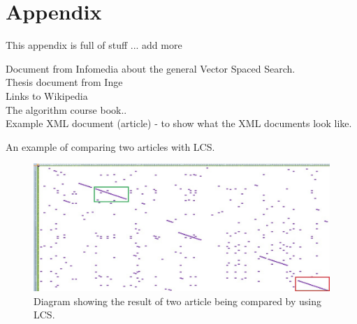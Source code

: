 \chapter{Appendix}

This appendix is full of stuff ... add more

Document from Infomedia about the general Vector Spaced Search.\\
Thesis document from Inge\\
Links to Wikipedia\\
The algorithm course book..\\
Example XML document (article) - to show what the XML documents look like.

An example of comparing two articles with LCS.

\begin{figure}
	\includegraphics[scale=0.65]{figures/LcsExample}
	\caption{Diagram showing the result of two article being compared by using LCS.}
\end{figure}
